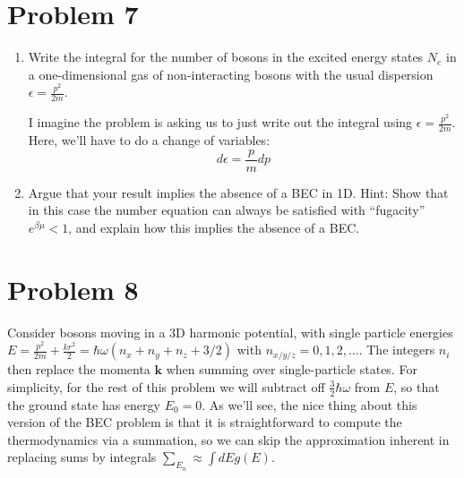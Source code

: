 \documentclass[10pt]{article}
\begin{document}
	\section*{Problem 7}
	\begin{enumerate}[label=\alph*)]
		\item Write the integral for the number of bosons in the excited energy states \( N_e \) in a 
			one-dimensional gas of non-interacting bosons with the usual dispersion 
			\( \epsilon = \frac{p^2}{2m} \).

			\begin{solution}
				I imagine the problem is asking us to just write out the integral using 
				\( \epsilon = \frac{p^2}{2m} \). Here, we'll have to do a change of variables:
				\[
					d \epsilon = \frac{p}{m} dp 
				\] 
			\end{solution}
		\item Argue that your result implies the absence of a BEC in 1D. Hint: Show that in this case the number 
			equation can always be satisfied with ``fugacity'' \( e^{\beta\mu} < 1\), and explain how this implies
			the absence of a BEC. 
	\end{enumerate}
	\pagebreak
	\section*{Problem 8}
	Consider bosons moving in a 3D harmonic potential, with single particle energies \( E = \frac{p^2}{2m}
	+ \frac{kr^2}{2} = \hbar \omega(n_x + n_y + n_z + 3 / 2)\) with \( n_{x / y / z} = 0, 1, 2, \dots \). The 
	integers  \( n_i \) then replace the momenta \( \mathbf k \) when summing over single-particle states. For 
	simplicity, for the rest of this problem we will subtract off \( \frac{3}{2}\hbar \omega \) from \( E \), 
	so that the ground state has energy \( E_0 = 0 \). As we'll see, the nice thing about this version of the 
	BEC problem is that it is straightforward to compute the thermodynamics via a summation, so we can skip the 
	approximation inherent in replacing sums by integrals \( \sum_{E_n} \approx \int dE g(E) \).
\end{document}
